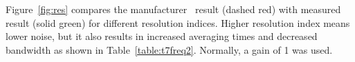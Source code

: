 






Figure~\ref{fig:res} compares the manufacturer~\cite{T7} result (dashed red) with  measured result (solid green) for different resolution indices. Higher resolution index means lower noise, but it also results in increased averaging times and decreased bandwidth as shown in Table~\ref{table:t7freq2}. Normally, a gain of 1 was used.


